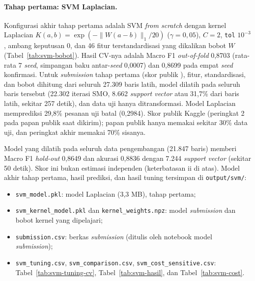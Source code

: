 \paragraph{Tahap pertama: SVM Laplacian.}
Konfigurasi akhir tahap pertama adalah SVM \textit{from scratch} dengan kernel Laplacian $K(a, b) = \exp(-\lVert W(a-b)\rVert_1/20)$ ($\gamma = 0{,}05$), $C = 2$, \texttt{tol} $10^{-3}$, ambang keputusan 0, dan 46 fitur terstandardisasi yang dikalikan bobot $W$ (Tabel~\ref{tab:svm-bobot}). Hasil CV-nya adalah Macro F1 \textit{out-of-fold} 0,8703 (rata-rata 7 \textit{seed}, simpangan baku antar-\textit{seed} 0,0007) dan 0,8699 pada empat \textit{seed} konfirmasi. Untuk \textit{submission} tahap pertama (skor publik \SVMLamaPublik{}), fitur, standardisasi, dan bobot dihitung dari seluruh 27.309 baris latih, model dilatih pada seluruh baris tersebut (22.302 iterasi SMO, 8.662 \textit{support vector} atau 31,7\% dari baris latih, sekitar 257 detik), dan data uji hanya ditransformasi. Model Laplacian memprediksi 29,8\% pesanan uji batal (0,2984). Skor publik Kaggle \SVMLamaPublik{} (peringkat 2 pada papan publik saat dikirim); papan publik hanya memakai sekitar 30\% data uji, dan peringkat akhir memakai 70\% sisanya.

Model yang dilatih pada seluruh data pengembangan (21.847 baris) memberi Macro F1 \textit{hold-out} 0,8649 dan akurasi 0,8836 dengan 7.244 \textit{support vector} (sekitar 50 detik). Skor ini bukan estimasi independen (keterbatasan ii di atas). Model akhir tahap pertama, hasil prediksi, dan hasil tuning tersimpan di \nolinkurl{output/svm/}:
\begin{itemize}
	\item \texttt{svm\_model.pkl}: model Laplacian (3,3 MB), tahap pertama;
	\item \texttt{svm\_kernel\_model.pkl} dan \texttt{kernel\_weights.npz}: model \textit{submission} dan bobot kernel yang dipelajari;
	\item \texttt{submission.csv}: berkas \textit{submission} (ditulis oleh notebook model \textit{submission});
	\item \texttt{svm\_tuning.csv}, \texttt{svm\_comparison.csv}, \texttt{svm\_cost\_sensitive.csv}: Tabel~\ref{tab:svm-tuning-cv}, Tabel~\ref{tab:svm-hasil}, dan Tabel~\ref{tab:svm-cost}.
\end{itemize}

